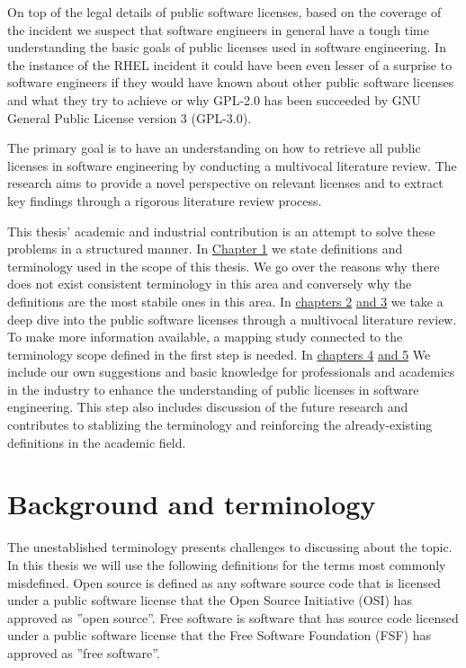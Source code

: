 On top of the legal details of public software licenses, based on the coverage of the incident we suspect that software engineers in general have a tough time understanding the basic goals of public licenses used in software engineering. In the instance of the RHEL incident it could have been even lesser of a surprise to software engineers if they would have known about other public software licenses and what they try to achieve or why GPL-2.0 has been succeeded by GNU General Public License version 3 (GPL-3.0).

The primary goal is to have an understanding on how to retrieve all public licenses in software engineering by conducting a multivocal literature review. The research aims to provide a novel perspective on relevant licenses and to extract key findings through a rigorous literature review process.

This thesis' academic and industrial contribution is an attempt to solve these problems in a structured manner. In \hyperref[intro]{Chapter 1}  we state definitions and terminology used in the scope of this thesis. We go over the reasons why there does not exist consistent terminology in this area and conversely why the definitions are the most stabile ones in this area. In \hyperref[methods]{chapters 2} \hyperref[results]{and 3} we take a deep dive into the public software licenses through a multivocal literature review. To make more information available, a mapping study connected to the terminology scope defined in the first step is needed. In \hyperref[discussion]{chapters 4} \hyperref[conclusions]{and 5} We include our own suggestions and basic knowledge for professionals and academics in the industry to enhance the understanding of public licenses in software engineering. This step also includes discussion of the future research and contributes to stablizing the terminology and reinforcing the already-existing definitions in the academic field.

\section{Background and terminology}
The unestablished terminology presents challenges to discussing about the topic. In this thesis we will use the following definitions for the terms most commonly misdefined. Open source is defined as any software source code that is licensed under a public software license that the Open Source Initiative (OSI) has approved as ''open source''. Free software is software that has source code licensed under a public software license that the Free Software Foundation (FSF) has approved as ''free software''.

